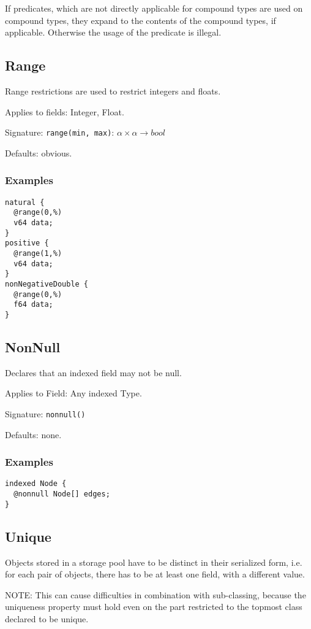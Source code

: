 \documentclass[a4paper,10pt]{article}
\begin{document}
If predicates, which are not directly applicable for compound types are used on compound types, they expand to the contents of the compound types, if applicable. Otherwise the usage of the predicate is illegal.

\subsection*{Range}
Range restrictions are used to restrict integers and floats.

Applies to fields: Integer, Float.

Signature: \verb/range(min, max)/: $\alpha \times \alpha → bool$

Defaults: obvious.

\subsubsection*{Examples}
\begin{verbatim}
natural {
  @range(0,%)
  v64 data;
}
positive {
  @range(1,%)
  v64 data;
}
nonNegativeDouble {
  @range(0,%)
  f64 data;
}
\end{verbatim}

\subsection*{NonNull}
Declares that an indexed field may not be null.

Applies to Field: Any indexed Type.

Signature: \verb/nonnull()/

Defaults: none.

\subsubsection*{Examples}
\begin{verbatim}
indexed Node {
  @nonnull Node[] edges;
}
\end{verbatim}


\subsection*{Unique}
Objects stored in a storage pool have to be distinct in their serialized form, i.e. for each pair of objects, there has to be at least one field, with a different value.

NOTE: This can cause difficulties in combination with sub-classing, because the uniqueness property must hold even on the part restricted to the topmost class declared to be unique.
\end{document}

